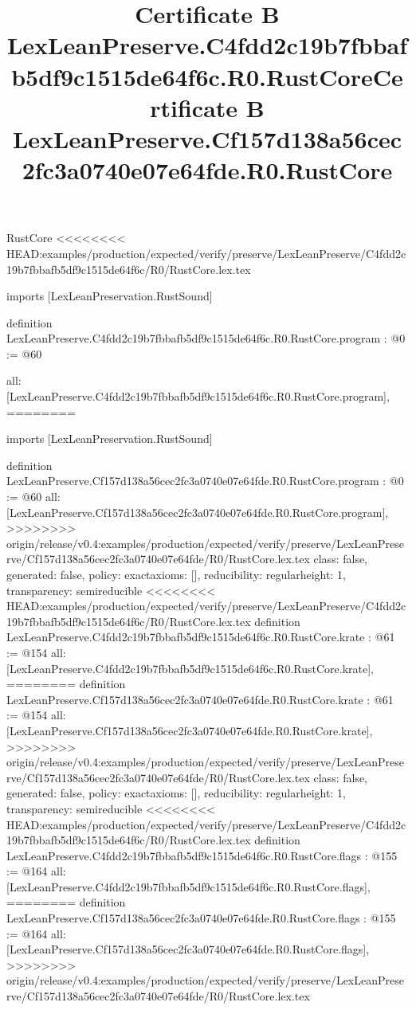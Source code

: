 \begin{lexlean}{RustCore}
<<<<<<<< HEAD:examples/production/expected/verify/preserve/LexLeanPreserve/C4fdd2c19b7fbbafb5df9c1515de64f6c/R0/RustCore.lex.tex
\title{Certificate B LexLeanPreserve.C4fdd2c19b7fbbafb5df9c1515de64f6c.R0.RustCore}
\begin{coremodule}
imports [LexLeanPreservation.RustSound]

definition LexLeanPreserve.C4fdd2c19b7fbbafb5df9c1515de64f6c.R0.RustCore.program : @0 := @60 {
  all: [LexLeanPreserve.C4fdd2c19b7fbbafb5df9c1515de64f6c.R0.RustCore.program],
========
\title{Certificate B LexLeanPreserve.Cf157d138a56cec2fc3a0740e07e64fde.R0.RustCore}
\begin{coremodule}
imports [LexLeanPreservation.RustSound]

definition LexLeanPreserve.Cf157d138a56cec2fc3a0740e07e64fde.R0.RustCore.program : @0 := @60 {
  all: [LexLeanPreserve.Cf157d138a56cec2fc3a0740e07e64fde.R0.RustCore.program],
>>>>>>>> origin/release/v0.4:examples/production/expected/verify/preserve/LexLeanPreserve/Cf157d138a56cec2fc3a0740e07e64fde/R0/RustCore.lex.tex
  class: false,
  generated: false,
  policy: exact{axioms: []},
  reducibility: regular{height: 1},
  transparency: semireducible
}
<<<<<<<< HEAD:examples/production/expected/verify/preserve/LexLeanPreserve/C4fdd2c19b7fbbafb5df9c1515de64f6c/R0/RustCore.lex.tex
definition LexLeanPreserve.C4fdd2c19b7fbbafb5df9c1515de64f6c.R0.RustCore.krate : @61 := @154 {
  all: [LexLeanPreserve.C4fdd2c19b7fbbafb5df9c1515de64f6c.R0.RustCore.krate],
========
definition LexLeanPreserve.Cf157d138a56cec2fc3a0740e07e64fde.R0.RustCore.krate : @61 := @154 {
  all: [LexLeanPreserve.Cf157d138a56cec2fc3a0740e07e64fde.R0.RustCore.krate],
>>>>>>>> origin/release/v0.4:examples/production/expected/verify/preserve/LexLeanPreserve/Cf157d138a56cec2fc3a0740e07e64fde/R0/RustCore.lex.tex
  class: false,
  generated: false,
  policy: exact{axioms: []},
  reducibility: regular{height: 1},
  transparency: semireducible
}
<<<<<<<< HEAD:examples/production/expected/verify/preserve/LexLeanPreserve/C4fdd2c19b7fbbafb5df9c1515de64f6c/R0/RustCore.lex.tex
definition LexLeanPreserve.C4fdd2c19b7fbbafb5df9c1515de64f6c.R0.RustCore.flags : @155 := @164 {
  all: [LexLeanPreserve.C4fdd2c19b7fbbafb5df9c1515de64f6c.R0.RustCore.flags],
========
definition LexLeanPreserve.Cf157d138a56cec2fc3a0740e07e64fde.R0.RustCore.flags : @155 := @164 {
  all: [LexLeanPreserve.Cf157d138a56cec2fc3a0740e07e64fde.R0.RustCore.flags],
>>>>>>>> origin/release/v0.4:examples/production/expected/verify/preserve/LexLeanPreserve/Cf157d138a56cec2fc3a0740e07e64fde/R0/RustCore.lex.tex
}}}
\end{coremodule}}
\end{coremodule}
\end{lexlean}
